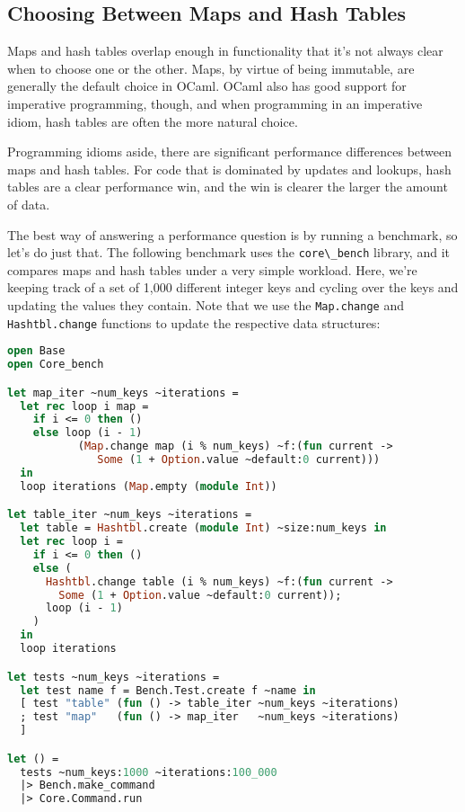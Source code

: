 \hypertarget{choosing-between-maps-and-hash-tables}{%
\subsection{Choosing Between Maps and Hash
Tables}\label{choosing-between-maps-and-hash-tables}}

Maps and hash tables overlap enough in functionality that it's not
always clear when to choose one or the other. Maps, by virtue of being
immutable, are generally the default choice in OCaml. OCaml also has
good support for imperative programming, though, and when programming in
an imperative idiom, hash tables are often the more natural choice.

Programming idioms aside, there are significant performance differences
between maps and hash tables. For code that is dominated by updates and
lookups, hash tables are a clear performance win, and the win is clearer
the larger the amount of data.

The best way of answering a performance question is by running a
benchmark, so let's do just that. The following benchmark uses the
\passthrough{\lstinline!core\_bench!} library, and it compares maps and
hash tables under a very simple workload. Here, we're keeping track of a
set of 1,000 different integer keys and cycling over the keys and
updating the values they contain. Note that we use the
\passthrough{\lstinline!Map.change!} and
\passthrough{\lstinline!Hashtbl.change!} functions to update the
respective data structures:

\begin{lstlisting}[language=Caml]
open Base
open Core_bench

let map_iter ~num_keys ~iterations =
  let rec loop i map =
    if i <= 0 then ()
    else loop (i - 1)
           (Map.change map (i % num_keys) ~f:(fun current ->
              Some (1 + Option.value ~default:0 current)))
  in
  loop iterations (Map.empty (module Int))

let table_iter ~num_keys ~iterations =
  let table = Hashtbl.create (module Int) ~size:num_keys in
  let rec loop i =
    if i <= 0 then ()
    else (
      Hashtbl.change table (i % num_keys) ~f:(fun current ->
        Some (1 + Option.value ~default:0 current));
      loop (i - 1)
    )
  in
  loop iterations

let tests ~num_keys ~iterations =
  let test name f = Bench.Test.create f ~name in
  [ test "table" (fun () -> table_iter ~num_keys ~iterations)
  ; test "map"   (fun () -> map_iter   ~num_keys ~iterations)
  ]

let () =
  tests ~num_keys:1000 ~iterations:100_000
  |> Bench.make_command
  |> Core.Command.run
\end{lstlisting}

